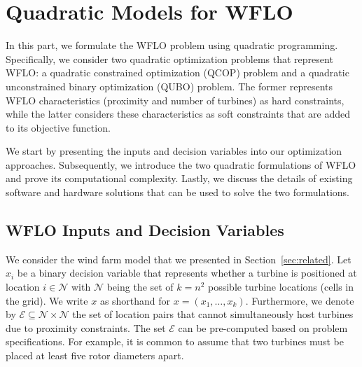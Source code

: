 \documentclass[preprint,12pt]{elsarticle}
\begin{document}
\section{Quadratic Models for WFLO}
\label{sec:QUBO4WFLO}

In this part, 
we formulate the WFLO problem
using quadratic programming. Specifically, we consider two
quadratic optimization problems that represent WFLO: a
quadratic constrained optimization (QCOP) problem and 
a quadratic unconstrained binary optimization (QUBO) problem. 
The former represents WFLO characteristics (proximity and number of turbines)
as hard constraints, while the latter considers these characteristics as soft constraints that are added to its objective function.

We start by presenting the inputs and decision variables into our optimization approaches.
Subsequently, we introduce the two quadratic formulations of WFLO and 
prove its computational complexity. Lastly, we discuss the details of existing
software and hardware solutions that can be used to solve the two formulations. 

\subsection{WFLO Inputs and Decision Variables} We consider the wind farm model that we presented in Section~\ref{sec:related}. 
Let $x_i$ be a binary decision variable that represents whether a 
turbine is positioned at location 
$i \in \mathcal{N}$ with $\mathcal{N}$ being the set 
of $k = n^2$ possible turbine locations (cells in the grid). We 
write $x$ as shorthand for $x = (x_1,\ldots, x_k)$. Furthermore,
we denote by $\mathcal{E} \subseteq \mathcal{N}\times \mathcal{N}$
the set of location pairs that cannot simultaneously host turbines 
due to proximity constraints. The set $\mathcal{E}$ can be pre-computed 
based on problem specifications. For example,
it is common to assume that two turbines must be placed at least five rotor diameters apart. 
\end{document}
